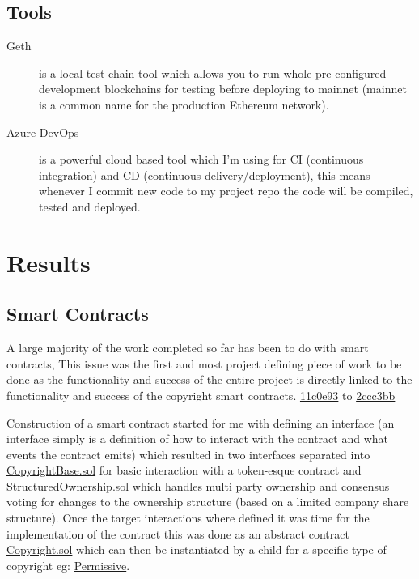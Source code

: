 \documentclass[12pt]{report}
\begin{document}
\section{Tools}

\begin{description}
	\item[Geth] is a local test chain tool which allows you to run whole pre configured development blockchains for testing before deploying to mainnet (mainnet is a common name for the production Ethereum network).
	\item[Azure DevOps] is a powerful cloud based tool which I'm using for CI (continuous integration) and CD (continuous delivery/deployment), this means whenever I commit new code to my project repo the code will be compiled, tested and deployed.
\end{description}

\chapter{Results}

\section{Smart Contracts}

A large majority of the work completed so far has been to do with smart contracts, This issue was the first and most project defining piece of work to be done as the functionality and success of the entire project is directly linked to the functionality and success of the copyright smart contracts. \href{https://github.com/MrHarrisonBarker/CRPL/commit/11c0e93bc92ad849c3cbea70db5ca637a320e5b2}{11c0e93} to \href{https://github.com/MrHarrisonBarker/CRPL/commit/2ccc3bbea3a7939e7f2012626ed91e4850a74d6f}{2ccc3bb}

Construction of a smart contract started for me with defining an interface (an interface simply is a definition of how to interact with the contract and what events the contract emits) which resulted in two interfaces separated into \href{https://github.com/MrHarrisonBarker/CRPL/blob/main/CRPL.Contracts/contracts/CopyrightBase.sol}{CopyrightBase.sol} for basic interaction with a token-esque contract and \href{https://github.com/MrHarrisonBarker/CRPL/blob/main/CRPL.Contracts/contracts/StructuredOwnership.sol}{StructuredOwnership.sol} which handles multi party ownership and consensus voting for changes to the ownership structure (based on a limited company share structure). Once the target interactions where defined it was time for the implementation of the contract this was done as an abstract contract \href{https://github.com/MrHarrisonBarker/CRPL/blob/main/CRPL.Contracts/contracts/Copyrights/Copyright.sol}{Copyright.sol} which can then be instantiated by a child for a specific type of copyright eg: \href{https://github.com/MrHarrisonBarker/CRPL/blob/main/CRPL.Contracts/contracts/Copyrights/Permissive.sol}{Permissive}.
\end{document}
